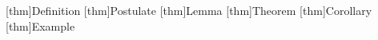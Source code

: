 \theoremstyle{blockmajor}
\theoremheaderfont{\normalfont\bfseries}
\theorembodyfont{\slshape}
\theoremsymbol{}

\newtheorem{thm}{thm}[\majorcounter]

[thm]{Definition}
[thm]{Postulate}
[thm]{Lemma}
[thm]{Theorem}
[thm]{Corollary}
[thm]{Example}
